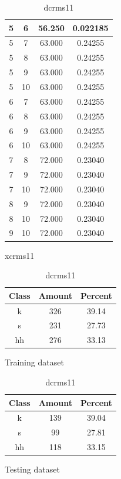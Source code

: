 \begin{table}
\begin{subtable}[h]{0.45\textwidth}
{\begin{tabular}{|c|c|c|c|}
 5 & 6 & 56.250 & 0.022185\\ \hline 
 5 & 7 & 63.000 & 0.24255\\ \hline 
 5 & 8 & 63.000 & 0.24255\\ \hline 
 5 & 9 & 63.000 & 0.24255\\ \hline 
 5 & 10 & 63.000 & 0.24255\\ \hline 
 6 & 7 & 63.000 & 0.24255\\ \hline 
 6 & 8 & 63.000 & 0.24255\\ \hline 
 6 & 9 & 63.000 & 0.24255\\ \hline 
 6 & 10 & 63.000 & 0.24255\\ \hline 
 7 & 8 & 72.000 & 0.23040\\ \hline 
 7 & 9 & 72.000 & 0.23040\\ \hline 
 7 & 10 & 72.000 & 0.23040\\ \hline 
 8 & 9 & 72.000 & 0.23040\\ \hline 
 8 & 10 & 72.000 & 0.23040\\ \hline 
 9 & 10 & 72.000 & 0.23040\\ \hline 

\end{tabular}
} \label{xlrms11}
\caption{xcrms11}
\end{subtable}

\begin{subtable}[h]{0.45\textwidth}
\centering
\begin{tabular}{|c|c|c|}
\hline
Class & Amount & Percent\\ \hline
k & 326 & 39.14\\ \hline
s & 231 & 27.73\\ \hline
hh & 276 & 33.13\\ \hline
\end{tabular}
\caption{Training dataset}
\end{subtable}
\hfill
\begin{subtable}[h]{0.45\textwidth}
\centering
\begin{tabular}{|c|c|c|}
\hline
Class & Amount & Percent\\ \hline
k & 139 & 39.04\\ \hline
s & 99 & 27.81\\ \hline
hh & 118 & 33.15\\ \hline
\end{tabular}
\caption{Testing dataset}
\end{subtable}
\hfill

\label{dlrms11}

\caption{dcrms11}

\end{table}